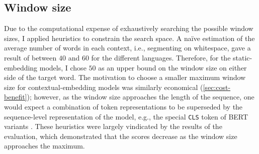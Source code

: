 \subsection{Window size}

Due to the computational expense of exhaustively searching the possible window sizes, I
applied heuristics to constrain the search space.
A naïve estimation of the average number of words in each context, i.e., segmenting on
whitespace, gave a result of between $40$ and $60$ for the different languages.
Therefore, for the static-embedding models, I chose $50$ as an upper bound on the
window size on either side of the target word.
The motivation to choose a smaller maximum window size for contextual-embedding models
was similarly economical (\cref{sec:cost-benefit}); however, as the window size
approaches the length of the sequence, one would expect a combination of token
representations to be superseded by the sequence-level representation of the model,
e.g., the special \texttt{CLS} token of BERT variants \parencite[4174]{Devlin2019}.
These heuristics were largely vindicated by the results of the evaluation, which
demonstrated that the scores decrease as the window size approaches the maximum.
